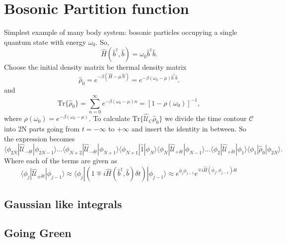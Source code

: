 \documentclass[a4paper, 12pt]{article}
\begin{document}
\section {Bosonic Partition function}
Simplest example of many body system: bosonic particles occupying a single quantum state with energy $\omega_0$. So,
\begin{equation}
\hat{H}(\hat{b}^{\dagger},\hat{b}) = \omega_0 \hat{b}^{\dagger}\hat{b}.
\end{equation}
Choose the initial density matrix be thermal density matrix
\begin{equation}
\hat{\rho}_0 = e^{-\beta(\hat{H}-\mu \hat{N})} = e^{-\beta (\omega_0 -\mu )\hat{b}^{\dagger}\hat{b}}.
\end{equation}
and
\begin{equation}
\mathrm{Tr}\{\hat{\rho}_0\} = \sum_{n=0}^{\infty}e^{-\beta (\omega_0 -\mu )n} = [1 - \rho(\omega_0)]^{-1},
\end{equation}
where $\rho(\omega_0) = e^{-\beta (\omega_0 -\mu )}$. To calculate $\mathrm{Tr}\{\hat{\mathcal{U}}_C \hat{\rho}_0\}$ we divide the time contour $\mathcal{C}$ into 2N parts going from $t=-\infty$ to $+\infty$ and insert the identity in between. So the expression becomes
\begin{equation}
\langle \phi_{2N}|\hat{\mathcal{U}}_{-\delta t}|\phi_{2N-1}\rangle  ... \langle \phi_{N+2}|\hat{\mathcal{U}}_{-\delta t}|\phi_{N+1}\rangle \langle \phi_{N+1}|\hat{1}|\phi_{N}\rangle \langle \phi_{N}|\hat{\mathcal{U}}_{+\delta t}|\phi_{N-1}\rangle ... \langle \phi_{2}|\hat{\mathcal{U}}_{+\delta t}|\phi_{1}\rangle \langle \phi_{1}|\hat{\rho}_0|\phi_{2N}\rangle.
\end{equation} 
Where each of the terms are given as
\begin{equation}
\langle \phi_{j}|\hat{\mathcal{U}}_{\pm \delta t}|\phi_{j-1}\rangle \approx \langle \phi_{j}|(1 \mp i\hat{H}(\hat{b}^{\dagger},\hat{b})\delta t)|\phi_{j-1}\rangle \approx e^{\bar{\phi}_j \phi_{j-1}}e^{\mp  i\hat{H}(\bar{\phi}_j ,\phi_{j-1})\delta t}
\end{equation}











\subsection {Gaussian like integrals}

\subsection {Going Green}



\end{document}
